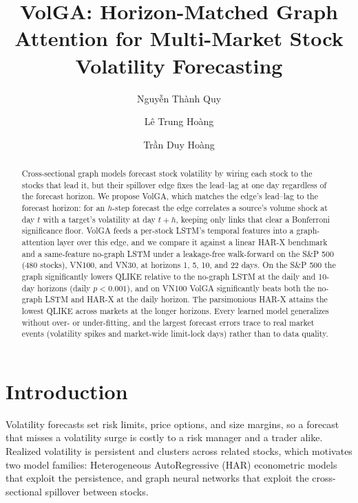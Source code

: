 \documentclass{llncs}
\begin{document}
\title{VolGA: Horizon-Matched Graph Attention for Multi-Market Stock Volatility Forecasting}
\author{Nguyễn Thành Quy \and Lê Trung Hoàng \and Trần Duy Hoàng}
\maketitle

\begin{abstract}
Cross-sectional graph models forecast stock volatility by wiring each stock to the stocks that lead it, but
their spillover edge fixes the lead--lag at one day regardless of the forecast horizon. We propose VolGA, which
matches the edge's lead--lag to the forecast horizon: for an $h$-step forecast the edge correlates a source's
volume shock at day $t$ with a target's volatility at day $t+h$, keeping only links that clear a Bonferroni
significance floor. VolGA feeds a per-stock LSTM's temporal features into a graph-attention layer over this
edge, and we compare it against a linear HAR-X benchmark and a same-feature no-graph LSTM under a leakage-free
walk-forward on the S\&P 500 (480 stocks), VN100, and VN30, at horizons 1, 5, 10, and 22 days. On the S\&P 500
the graph significantly lowers QLIKE relative to the no-graph LSTM at the daily and 10-day horizons (daily
$p<0.001$), and on VN100 VolGA significantly beats both the no-graph LSTM and HAR-X at the daily horizon. The
parsimonious HAR-X attains the lowest QLIKE across markets at the longer horizons. Every learned model generalizes without over- or under-fitting,
and the largest forecast errors trace to real market events (volatility spikes and market-wide limit-lock days)
rather than to data quality.
\end{abstract}

\section{Introduction}
Volatility forecasts set risk limits, price options, and size margins, so a forecast that misses a volatility
surge is costly to a risk manager and a trader alike. Realized volatility is persistent and clusters across
related stocks, which motivates two model families: Heterogeneous AutoRegressive (HAR) econometric models that
exploit the persistence, and graph neural networks that exploit the cross-sectional spillover between stocks.
\end{document}

